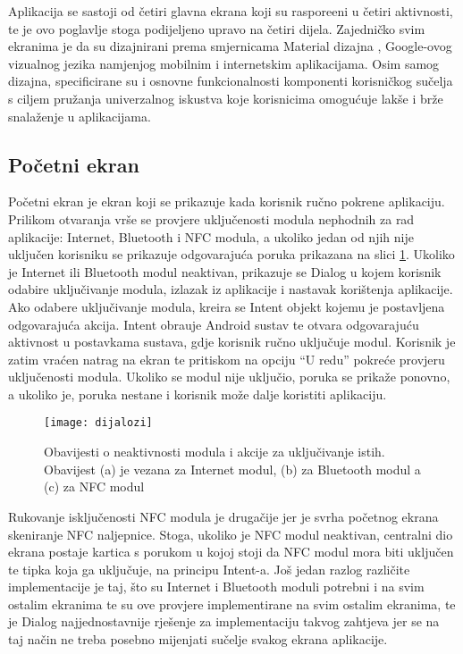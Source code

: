 Aplikacija se sastoji od \v{c}etiri glavna ekrana koji su raspore\dj eni u \v{c}etiri aktivnosti, te je ovo poglavlje stoga podijeljeno upravo na \v{c}etiri dijela. Zajedni\v{c}ko svim ekranima je da su dizajnirani prema smjernicama Material dizajna \cite{materialDesign}, Google-ovog vizualnog jezika namjenjog mobilnim i internetskim aplikacijama. Osim samog dizajna, specificirane su i osnovne funkcionalnosti komponenti korisni\v{c}kog su\v{c}elja s ciljem pru\v{z}anja univerzalnog iskustva koje korisnicima omogu\'{c}uje lak\v{s}e i br\v{z}e snala\v{z}enje u aplikacijama.

\subsection{Po\v{c}etni ekran}

Po\v{c}etni ekran je ekran koji se prikazuje kada korisnik ru\v{c}no pokrene aplikaciju. Prilikom otvaranja vr\v{s}e se provjere uklju\v{c}enosti modula nephodnih za rad aplikacije: Internet, Bluetooth i NFC modula, a ukoliko jedan od njih nije uklju\v{c}en korisniku se prikazuje odgovaraju\'{c}a poruka prikazana na slici \ref{fig:dijalozi}.
Ukoliko je Internet ili Bluetooth modul neaktivan, prikazuje se Dialog \cite{androidDialog} u kojem korisnik odabire uklju\v{c}ivanje modula, izlazak iz aplikacije i nastavak kori\v{s}tenja aplikacije. Ako odabere uklju\v{c}ivanje modula, kreira se Intent objekt kojemu je postavljena odgovaraju\'{c}a akcija. Intent obra\dj uje Android sustav te otvara odgovaraju\'{c}u aktivnost u postavkama sustava, gdje korisnik ru\v{c}no uklju\v{c}uje modul. Korisnik je zatim vra\'{c}en natrag na ekran te pritiskom na opciju ``U redu'' pokre\'{c}e provjeru uklju\v{c}enosti modula. Ukoliko se modul nije uklju\v{c}io, poruka se prika\v{z}e ponovno, a ukoliko je, poruka nestane i korisnik mo\v{z}e dalje koristiti aplikaciju.


\begin{figure}[!htbp]
	\begin{center}
 \texttt{[image: dijalozi]}
 \caption{Obavijesti o neaktivnosti modula i akcije za uklju\v{c}ivanje istih. Obavijest (a) je vezana za Internet modul, (b) za Bluetooth modul a (c) za NFC modul}
 \label{fig:dijalozi}
	\end{center}
\end{figure}



Rukovanje isklju\v{c}enosti NFC modula je druga\v{c}ije jer je svrha po\v{c}etnog ekrana skeniranje NFC naljepnice. Stoga, ukoliko je NFC modul neaktivan, centralni dio ekrana postaje kartica s porukom u kojoj stoji da NFC modul mora biti uklju\v{c}en te tipka koja ga uklju\v{c}uje, na principu Intent-a. Jo\v{s} jedan razlog razli\v{c}ite implementacije je taj, \v{s}to su Internet i Bluetooth moduli potrebni i na svim ostalim ekranima te su ove provjere implementirane na svim ostalim ekranima, te je Dialog najjednostavnije rje\v{s}enje za implementaciju takvog zahtjeva jer se na taj na\v{c}in ne treba posebno mijenjati su\v{c}elje svakog ekrana aplikacije.

